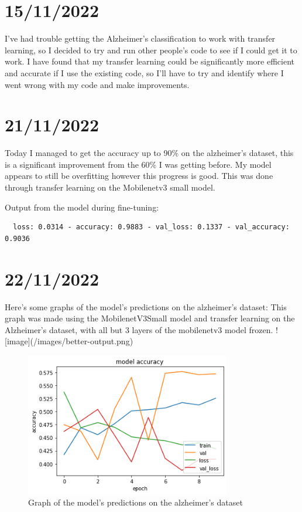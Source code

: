 \documentclass[]{final_report}
\begin{document}
\section*{15/11/2022}

I've had trouble getting the Alzheimer's classification to work with transfer learning, so I decided to try and run other people's code to see if I could get it to work.
I have found that my transfer learning could be significantly more efficient and accurate if I use the existing code, so I'll have to try and identify where I went wrong with my code and make improvements.

\section*{21/11/2022}

Today I managed to get the accuracy up to 90\% on the alzheimer's dataset, this is a significant improvement from the 60\% I was getting before. My model appears to still be overfitting however this progress is good. This was done through transfer learning on the Mobilenetv3 small model.

Output from the model during fine-tuning:
\begin{lstlisting}
  loss: 0.0314 - accuracy: 0.9883 - val_loss: 0.1337 - val_accuracy: 0.9036
\end{lstlisting}

\section*{22/11/2022}

Here's some graphs of the model's predictions on the alzheimer's dataset:
This graph was made using the MobilenetV3Small model and transfer learning on the Alzheimer's dataset, with all but 3 layers of the mobilenetv3 model frozen.
![image](/images/better-output.png)
\begin{figure}[ht!]
  \centering
  \includegraphics[width=0.8\textwidth]{images/better-output.png}
  \caption{Graph of the model's predictions on the alzheimer's dataset}
\end{figure}
\end{document}
